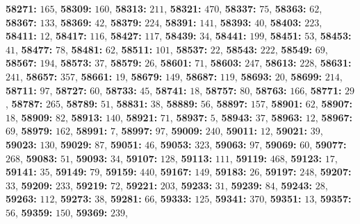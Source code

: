 \textsf{\bfseries 58271:} $165$, \textsf{\bfseries 58309:} $160$, \textsf{\bfseries 58313:} $211$, \textsf{\bfseries 58321:} $470$, \textsf{\bfseries 58337:} $75$, \textsf{\bfseries 58363:} $62$, \textsf{\bfseries 58367:} $133$, \textsf{\bfseries 58369:} $42$, \textsf{\bfseries 58379:} $224$, \textsf{\bfseries 58391:} $141$, \textsf{\bfseries 58393:} $40$, \textsf{\bfseries 58403:} $223$, \textsf{\bfseries 58411:} $12$, \textsf{\bfseries 58417:} $116$, \textsf{\bfseries 58427:} $117$, \textsf{\bfseries 58439:} $34$, \textsf{\bfseries 58441:} $199$, \textsf{\bfseries 58451:} $53$, \textsf{\bfseries 58453:} $41$, \textsf{\bfseries 58477:} $78$, \textsf{\bfseries 58481:} $62$, \textsf{\bfseries 58511:} $101$, \textsf{\bfseries 58537:} $22$, \textsf{\bfseries 58543:} $222$, \textsf{\bfseries 58549:} $69$, \textsf{\bfseries 58567:} $194$, \textsf{\bfseries 58573:} $37$, \textsf{\bfseries 58579:} $26$, \textsf{\bfseries 58601:} $71$, \textsf{\bfseries 58603:} $247$, \textsf{\bfseries 58613:} $228$, \textsf{\bfseries 58631:} $241$, \textsf{\bfseries 58657:} $357$, \textsf{\bfseries 58661:} $19$, \textsf{\bfseries 58679:} $149$, \textsf{\bfseries 58687:} $119$, \textsf{\bfseries 58693:} $20$, \textsf{\bfseries 58699:} $214$, \textsf{\bfseries 58711:} $97$, \textsf{\bfseries 58727:} $60$, \textsf{\bfseries 58733:} $45$, \textsf{\bfseries 58741:} $18$, \textsf{\bfseries 58757:} $80$, \textsf{\bfseries 58763:} $166$, \textsf{\bfseries 58771:} $29$, \textsf{\bfseries 58787:} $265$, \textsf{\bfseries 58789:} $51$, \textsf{\bfseries 58831:} $38$, \textsf{\bfseries 58889:} $56$, \textsf{\bfseries 58897:} $157$, \textsf{\bfseries 58901:} $62$, \textsf{\bfseries 58907:} $18$, \textsf{\bfseries 58909:} $82$, \textsf{\bfseries 58913:} $140$, \textsf{\bfseries 58921:} $71$, \textsf{\bfseries 58937:} $5$, \textsf{\bfseries 58943:} $37$, \textsf{\bfseries 58963:} $12$, \textsf{\bfseries 58967:} $69$, \textsf{\bfseries 58979:} $162$, \textsf{\bfseries 58991:} $7$, \textsf{\bfseries 58997:} $97$, \textsf{\bfseries 59009:} $240$, \textsf{\bfseries 59011:} $12$, \textsf{\bfseries 59021:} $39$, \textsf{\bfseries 59023:} $130$, \textsf{\bfseries 59029:} $87$, \textsf{\bfseries 59051:} $46$, \textsf{\bfseries 59053:} $323$, \textsf{\bfseries 59063:} $97$, \textsf{\bfseries 59069:} $60$, \textsf{\bfseries 59077:} $268$, \textsf{\bfseries 59083:} $51$, \textsf{\bfseries 59093:} $34$, \textsf{\bfseries 59107:} $128$, \textsf{\bfseries 59113:} $111$, \textsf{\bfseries 59119:} $468$, \textsf{\bfseries 59123:} $17$, \textsf{\bfseries 59141:} $35$, \textsf{\bfseries 59149:} $79$, \textsf{\bfseries 59159:} $440$, \textsf{\bfseries 59167:} $149$, \textsf{\bfseries 59183:} $26$, \textsf{\bfseries 59197:} $248$, \textsf{\bfseries 59207:} $33$, \textsf{\bfseries 59209:} $233$, \textsf{\bfseries 59219:} $72$, \textsf{\bfseries 59221:} $203$, \textsf{\bfseries 59233:} $31$, \textsf{\bfseries 59239:} $84$, \textsf{\bfseries 59243:} $28$, \textsf{\bfseries 59263:} $112$, \textsf{\bfseries 59273:} $38$, \textsf{\bfseries 59281:} $66$, \textsf{\bfseries 59333:} $125$, \textsf{\bfseries 59341:} $370$, \textsf{\bfseries 59351:} $13$, \textsf{\bfseries 59357:} $56$, \textsf{\bfseries 59359:} $150$, \textsf{\bfseries 59369:} $239$, 
